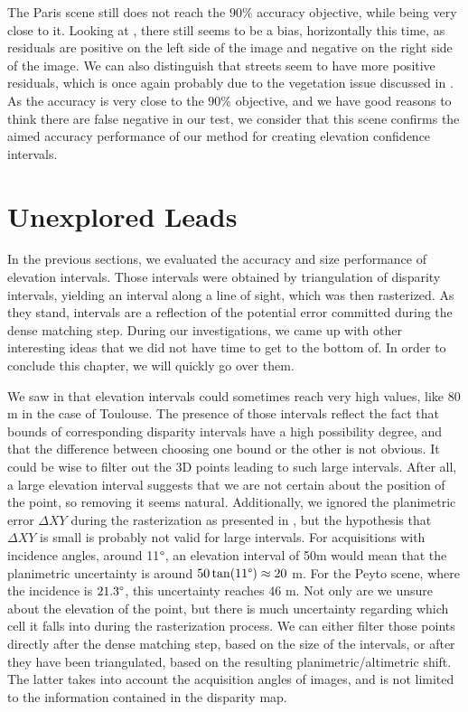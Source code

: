 The Paris scene still does not reach the $90\%$ accuracy objective, while being very close to it. Looking at , there still seems to be a bias, horizontally this time, as residuals are positive on the left side of the image and negative on the right side of the image. We can also distinguish that streets seem to have more positive residuals, which is once again probably due to the vegetation issue discussed in . As the accuracy is very close to the $90\%$ objective, and we have good reasons to think there are false negative in our test, we consider that this scene confirms the aimed accuracy performance of our method for creating elevation confidence intervals. 

\section{Unexplored Leads}\label{sec:unexplored_leads}
In the previous sections, we evaluated the accuracy and size performance of elevation intervals. Those intervals were obtained by triangulation of disparity intervals, yielding an interval along a line of sight, which was then rasterized. As they stand, intervals are a reflection of the potential error committed during the dense matching step. During our investigations, we came up with other interesting ideas that we did not have time to get to the bottom of. In order to conclude this chapter, we will quickly go over them.

We saw in  that elevation intervals could sometimes reach very high values, like $80$ m in the case of Toulouse. The presence of those intervals reflect the fact that bounds of corresponding disparity intervals have a high possibility degree, and that the difference between choosing one bound or the other is not obvious. It could be wise to filter out the 3D points leading to such large intervals. After all, a large elevation interval suggests that we are not certain about the position of the point, so removing it seems natural. Additionally, we ignored the planimetric error $\Delta XY$ during the rasterization as presented in , but the hypothesis that $\Delta XY$ is small is probably not valid for large intervals. For acquisitions with incidence angles, around 11$\degree$, an elevation interval of 50m would mean that the planimetric uncertainty is around $50\tan(11\degree)\approx20$ m. For the Peyto scene, where the incidence is $21.3\degree$, this uncertainty reaches $46$ m. Not only are we unsure about the elevation of the point, but there is much uncertainty regarding which cell it falls into during the rasterization process. We can either filter those points directly after the dense matching step, based on the size of the intervals, or after they have been triangulated, based on the resulting planimetric/altimetric shift. The latter takes into account the acquisition angles of images, and is not limited to the information contained in the disparity map. 

